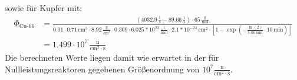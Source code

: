 \documentclass[12pt,german]{article}
\begin{document}
    sowie für Kupfer mit:
    \begin{align*}
        \Phi_{\text{Cu-66}} &= \frac{\left(4032.9\, \frac{1}{\text{s}} - 89.66\, \frac{1}{\text{s}}\right) \cdot 65\, \frac{\text{g}}{\text{mol}}}{0.01 \cdot 0.71\, \text{cm}^3 \cdot 8.92\, \frac{\text{g}}{\text{cm}^3} \cdot 0.309 \cdot 6.025 * 10^{23}\, \frac{1}{\text{mol}} \cdot 2.1 * 10^{-24}\, \text{cm}^2 \cdot \left[1 - \exp\left(- \frac{\ln(2)}{5.86\, \text{min}} \cdot 10\, \text{min}\right)\right]} \\
            &= 1.499 \cdot 10^7\, \frac{\text{n}}{\text{cm}^2 \cdot \text{s}}
    \end{align*}
    Die berechneten Werte liegen damit wie erwartet in der für Nullleistungsreaktoren gegebenen Größenordnung von \(10^7 \frac{\text{n}}{\text{cm}^2 \cdot \text{s}}\).
\end{document}
